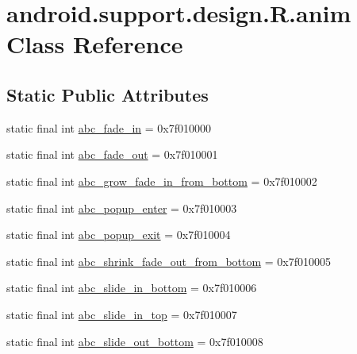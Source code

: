 \hypertarget{classandroid_1_1support_1_1design_1_1_r_1_1anim}{}\section{android.\+support.\+design.\+R.\+anim Class Reference}
\label{classandroid_1_1support_1_1design_1_1_r_1_1anim}
\subsection*{Static Public Attributes}
\begin{DoxyCompactItemize}
\item 
static final int \mbox{\hyperlink{classandroid_1_1support_1_1design_1_1_r_1_1anim_ad1aab55327ed71f67234994b071ab794}{abc\+\_\+fade\+\_\+in}} = 0x7f010000
\item 
static final int \mbox{\hyperlink{classandroid_1_1support_1_1design_1_1_r_1_1anim_a8773dce408c4627fa162cb820d04f0da}{abc\+\_\+fade\+\_\+out}} = 0x7f010001
\item 
static final int \mbox{\hyperlink{classandroid_1_1support_1_1design_1_1_r_1_1anim_aa783dc7f4ea2b32ab95bce1ed298d369}{abc\+\_\+grow\+\_\+fade\+\_\+in\+\_\+from\+\_\+bottom}} = 0x7f010002
\item 
static final int \mbox{\hyperlink{classandroid_1_1support_1_1design_1_1_r_1_1anim_abbdbb94547e7204418714ef8fbd684c0}{abc\+\_\+popup\+\_\+enter}} = 0x7f010003
\item 
static final int \mbox{\hyperlink{classandroid_1_1support_1_1design_1_1_r_1_1anim_a233cdba0ad27e14b39b7edbb3c3ecf60}{abc\+\_\+popup\+\_\+exit}} = 0x7f010004
\item 
static final int \mbox{\hyperlink{classandroid_1_1support_1_1design_1_1_r_1_1anim_a84c97609991229557250b451bec9739a}{abc\+\_\+shrink\+\_\+fade\+\_\+out\+\_\+from\+\_\+bottom}} = 0x7f010005
\item 
static final int \mbox{\hyperlink{classandroid_1_1support_1_1design_1_1_r_1_1anim_a7de45fdd3717db19f19d80482c3cdbf5}{abc\+\_\+slide\+\_\+in\+\_\+bottom}} = 0x7f010006
\item 
static final int \mbox{\hyperlink{classandroid_1_1support_1_1design_1_1_r_1_1anim_a8b800ace39e4bfc75cc8f15bec2ea3e4}{abc\+\_\+slide\+\_\+in\+\_\+top}} = 0x7f010007
\item 
static final int \mbox{\hyperlink{classandroid_1_1support_1_1design_1_1_r_1_1anim_a39e216575b2d8d55ee799f74ccabf405}{abc\+\_\+slide\+\_\+out\+\_\+bottom}} = 0x7f010008
\item 

\end{DoxyCompactItemize}
